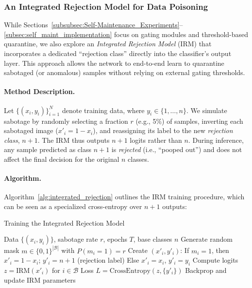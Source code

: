 \documentclass[12pt]{article}
\begin{document}
\subsubsection{An Integrated Rejection Model for Data Poisoning}
\label{subsubsec:integrated_rejection}

While Sections~\ref{subsubsec:Self-Maintenance_Experiments}--\ref{subsec:self_maint_implementation}
focus on gating modules and threshold-based quarantine, we also explore
an \emph{Integrated Rejection Model} (IRM) that incorporates a
dedicated ``rejection class'' directly into the classifier’s output layer.
This approach allows the network to end-to-end learn to quarantine sabotaged
(or anomalous) samples without relying on external gating thresholds.

\paragraph{Method Description.}
Let $\{(x_i,y_i)\}_{i=1}^{N}$ denote training data, where $y_i \in \{1,\dots,n\}$.
We simulate sabotage by randomly selecting a fraction $r$ (e.g., 5\%) of samples,
inverting each sabotaged image ($x'_i = 1-x_i$), and reassigning its label to
the new \emph{rejection class}, $n+1$. The IRM thus outputs $n+1$ logits rather
than $n$. During inference, any sample predicted as class $n+1$ is \emph{rejected}
(i.e., “pooped out”) and does not affect the final decision for the original $n$ classes.

\paragraph{Algorithm.}
Algorithm~\ref{alg:integrated_rejection} outlines the IRM training procedure,
which can be seen as a specialized cross-entropy over $n+1$ outputs:

\begin{algorithm}[ht]
\caption{Training the Integrated Rejection Model}
\label{alg:integrated_rejection}
\begin{algorithmic}[1]
\REQUIRE Data $\{(x_i, y_i)\}$, sabotage rate $r$, epochs $T$, base classes $n$
      \STATE Generate random mask $m \in \{0,1\}^{|\mathcal{B}|}$ with $P(m_i=1)=r$
      \STATE Create $(x'_i,y'_i)$:
         \quad If $m_i=1$, then $x'_i = 1 - x_i$; $y'_i = n+1$ (rejection label)
         \quad Else $x'_i = x_i$, $y'_i = y_i$
      \STATE Compute logits $z = \mathrm{IRM}(x'_i)$ for $i \in \mathcal{B}$
      \STATE Loss $L = \mathrm{CrossEntropy}(z, \{y'_i\})$
      \STATE Backprop and update IRM parameters
   \ENDFOR
\ENDFOR
\end{algorithmic}
\end{algorithm}
\end{document}

